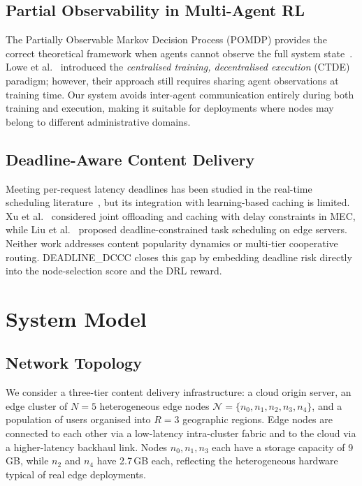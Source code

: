 \documentclass[conference]{IEEEtran}
\begin{document}
\subsection{Partial Observability in Multi-Agent RL}

The Partially Observable Markov Decision Process (POMDP) provides the
correct theoretical framework when agents cannot observe the full system
state~\cite{kaelbling1998planning}.  Lowe et al.~\cite{lowe2017multi}
introduced the \emph{centralised training, decentralised execution}
(CTDE) paradigm; however, their approach still requires sharing agent
observations at training time.  Our system avoids inter-agent
communication entirely during both training and execution, making it
suitable for deployments where nodes may belong to different
administrative domains.

\subsection{Deadline-Aware Content Delivery}

Meeting per-request latency deadlines has been studied in the
real-time scheduling literature~\cite{buttazzo2011hard}, but its
integration with learning-based caching is limited.  Xu
et al.~\cite{xu2019joint} considered joint offloading and caching with
delay constraints in MEC, while Liu et al.~\cite{liu2020deadline}
proposed deadline-constrained task scheduling on edge servers.  Neither
work addresses content popularity dynamics or multi-tier cooperative
routing.  DEADLINE\_DCCC closes this gap by embedding deadline risk
directly into the node-selection score and the DRL reward.

\section{System Model}
\label{sec:model}

\subsection{Network Topology}

We consider a three-tier content delivery infrastructure: a cloud
origin server, an edge cluster of $N = 5$ heterogeneous edge nodes
$\mathcal{N} = \{n_0, n_1, n_2, n_3, n_4\}$, and a population of
users organised into $R = 3$ geographic regions.  Edge nodes are
connected to each other via a low-latency intra-cluster fabric and to
the cloud via a higher-latency backhaul link.  Nodes $n_0, n_1, n_3$
each have a storage capacity of 9\,GB, while $n_2$ and $n_4$ have
2.7\,GB each, reflecting the heterogeneous hardware typical of real
edge deployments.
\end{document}
